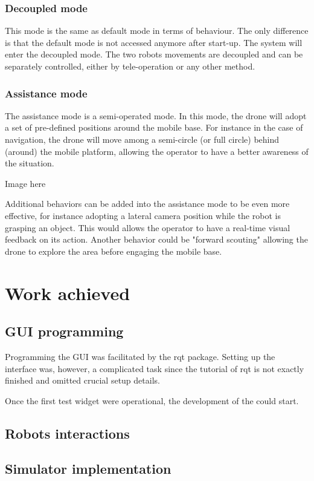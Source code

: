 \documentclass[11pt,a4paper]{article}
\begin{document}
\subsubsection{Decoupled mode}
This mode is the same as default mode in terms of behaviour. The only difference is that the default mode
is not accessed anymore after start-up. The system will enter the decoupled mode. The two robots movements
are decoupled and can be separately controlled, either by tele-operation or any other method.

\subsubsection{Assistance mode}
The assistance mode is a semi-operated mode. In this mode, the drone will adopt a set of pre-defined
positions around the mobile base. For instance in the case of navigation, the drone will move among a semi-circle (or full circle) behind (around) the mobile platform, allowing the operator to have a better awareness of the situation.
\begin{center}
Image here
\end{center}
Additional behaviors can be added into the assistance mode to be even more effective, for instance
adopting a lateral camera position while the robot is grasping an object. This would allows the operator
to have a real-time visual feedback on its action. Another behavior could be "forward scouting" allowing the drone to explore the area before engaging the mobile base.


\section{Work achieved}

\subsection{GUI programming}
Programming the GUI was facilitated by the rqt package. Setting up the interface was, however, a complicated task since the tutorial of rqt is not exactly finished and omitted crucial setup details.

Once the first test widget were operational, the development of the could start.
\subsection{Robots interactions}
\subsection{Simulator implementation}
\end{document}
